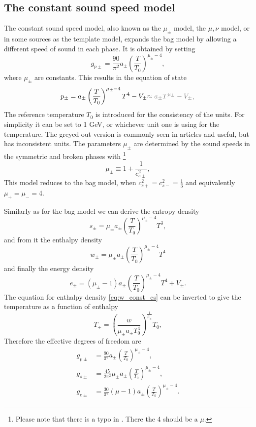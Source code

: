 \subsection{The constant sound speed model}
The constant sound speed model, also known as the $\mu_\pm$ model, the $\mu, \nu$ model,
or in some sources as the template model,
expands the bag model by allowing a different speed of sound in each phase.
It is obtained by setting
\begin{equation}
g_{p\pm} = \frac{90}{\pi^2} a_\pm \left( \frac{T}{T_0} \right)^{\mu_\pm - 4},
\end{equation}
where $\mu_\pm$ are constants.
This results in the equation of state
\cites[eq. 15]{giese_2021}[eq. 38]{giese_2020}
\begin{equation}
p_\pm = a_\pm \left( \frac{T}{T_0} \right)^{\mu_\pm - 4} T^4 - V_\pm {\color{gray} \approx a_\pm T^{\mu_\pm} - V_\pm }, \\
\end{equation}
The reference temperature $T_0$ is introduced for the consistency of the units.
For simplicity it can be set to 1 GeV, or whichever unit one is using for the temperature.
The greyed-out version is commonly seen in articles and useful, but has inconsistent units.
The parameters $\mu_\pm$ are determined by the sound speeds in the symmetric and broken phases with
\cites[eq. 16]{giese_2021}[eq. 39]{giese_2020}
\footnote{Please note that there is a typo in \cite[eq. 15]{giese_2021}. There the 4 should be a $\mu$.}
\begin{equation}
\mu_\pm \equiv 1 + \frac{1}{c_{s\pm}^2},
\end{equation}
This model reduces to the bag model,
when $c_{s+}^2 = c_{s-}^2 = \frac{1}{3}$
and equivalently
$\mu_+ = \mu_- = 4$.

Similarly as for the bag model we can derive the entropy density
\begin{equation}
s_\pm = \mu_\pm a_\pm \left( \frac{T}{T_0} \right)^{\mu_\pm - 4} T^3,
\end{equation}
and from it the enthalpy density
\begin{equation}
w_\pm = \mu_\pm a_\pm \left( \frac{T}{T_0} \right)^{\mu_\pm - 4} T^4
\label{eq:w_const_cs}
\end{equation}
and finally the energy density
\begin{equation}
e_\pm = (\mu_\pm - 1) a_\pm \left( \frac{T}{T_0} \right)^{\mu_\pm - 4} T^4 + V_\pm.
\end{equation}
The equation for enthalpy density \eqref{eq:w_const_cs} can be inverted to give the temperature as a function of enthalpy
\begin{equation}
T_\pm = \left( \frac{w}{\mu_\pm a_\pm T_0^4} \right)^\frac{1}{\mu_\pm} T_0,
\end{equation}
Therefore the effective degrees of freedom are
\begin{align}
g_{p\pm} &= \frac{90}{\pi^2} a_\pm \left( \frac{T}{T_0} \right)^{\mu_\pm - 4}, \\
g_{s\pm} &= \frac{45}{2\pi^2} \mu_\pm a_\pm \left( \frac{T}{T_0} \right)^{\mu_\pm - 4}, \\
g_{e\pm} &= \frac{30}{\pi^2} (\mu - 1) a_\pm \left( \frac{T}{T_0} \right)^{\mu_\pm - 4}.
\end{align}


